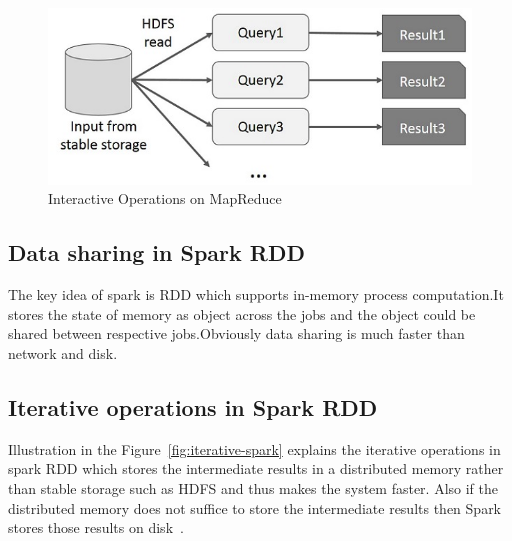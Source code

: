 




\begin{figure}[!ht]
  \centering\includegraphics[width=\columnwidth]{images/interactive-MapReduce.png}
   \caption{Interactive Operations on MapReduce
   ~\cite{hid-sp18-410-spark-RDD}}\label{fig:interactive-MapRed}
\end{figure}




\subsection{Data sharing in Spark RDD}
The key idea of spark is RDD which supports in-memory process computation.It 
stores the state of memory as object across the jobs and the object could be 
shared between respective jobs.Obviously data sharing is much faster than 
network and disk.


\subsection{Iterative operations in Spark RDD}

Illustration in the Figure~\ref{fig:iterative-spark} explains the iterative 
operations in spark RDD which stores the intermediate results in a distributed 
memory rather than stable storage such as HDFS and thus makes the system faster.
Also if the distributed memory does not suffice to store the intermediate 
results then Spark stores those results on disk~\cite{hid-sp18-410-spark-RDD}.

